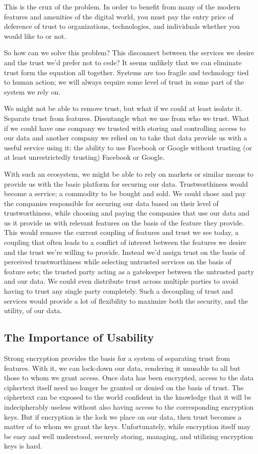This is the crux of the problem. In order to benefit from many of the
modern features and amenities of the digital world, you must pay the
entry price of deference of trust to organizations, technologies, and
individuals whether you would like to or not.

So how can we solve this problem? This disconnect between the services
we desire and the trust we'd prefer not to cede? It seems unlikely
that we can eliminate trust form the equation all together. Systems
are too fragile and technology tied to human action; we will always
require some level of trust in some part of the system we rely on.

We might not be able to remove trust, but what if we could at least
isolate it. Separate trust from features. Disentangle what we use from
who we trust. What if we could have one company we trusted with
storing and controlling access to our data and another company we
relied on to take that data provide us with a useful service using it:
the ability to use Facebook or Google without trusting (or at least
unrestrictedly trusting) Facebook or Google.

With such an ecosystem, we might be able to rely on markets or similar
means to provide us with the basic platform for securing our
data. Trustworthiness would become a service; a commodity to be bought
and sold. We could chose and pay the companies responsible for
securing our data based on their level of trustworthiness, while
choosing and paying the companies that use our data and us it provide
us with relevant features on the basis of the feature they
provide. This would remove the current coupling of features and trust
we see today, a coupling that often leads to a conflict of interest
between the features we desire and the trust we're willing to
provide. Instead we'd assign trust on the basis of perceived
trustworthiness while selecting untrusted services on the basis of
feature sets; the trusted party acting as a gatekeeper between the
untrusted party and our data. We could even distribute trust across
multiple parties to avoid having to trust any single party
completely. Such a decoupling of trust and services would provide a
lot of flexibility to maximize both the security, and the utility, of
our data.

\subsection{The Importance of Usability}

Strong encryption provides the basis for a system of separating trust
from features. With it, we can lock-down our data, rendering it
unusable to all but those to whom we grant access. Once data has been
encrypted, access to the data ciphertext itself need no longer be
granted or denied on the basis of trust. The ciphertext can be exposed
to the world confident in the knowledge that it will be indecipherably
useless without also having access to the corresponding encryption
keys. But if encryption is the lock we place on our data, then trust
becomes a matter of to whom we grant the keys. Unfortunately, while
encryption itself may be easy and well understood, securely storing,
managing, and utilizing encryption keys is hard.

